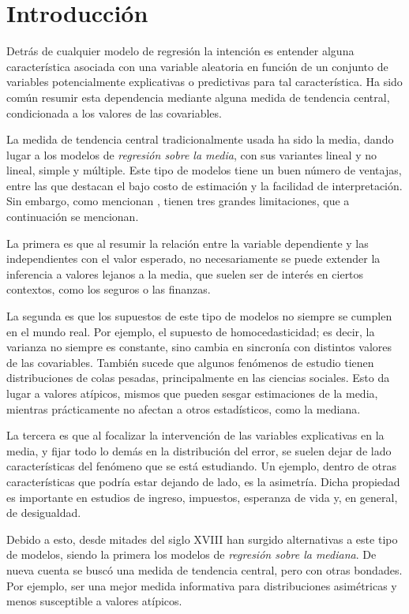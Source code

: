 \chapter{Introducci\'on}

Detr\'as de cualquier modelo de regresi\'on la intenci\'on es entender alguna caracter\'istica asociada con una variable aleatoria en funci\'on de un conjunto de variables potencialmente explicativas o predictivas para tal caracter\'istica. Ha sido com\'un resumir esta dependencia mediante alguna medida de tendencia central, condicionada a los valores de las covariables.

La medida de tendencia central tradicionalmente usada ha sido la media, dando lugar a los modelos de \textit{regresi\'on sobre la media}, con sus variantes lineal y no lineal, simple y m\'ultiple. Este tipo de modelos tiene un buen n\'umero de ventajas, entre las que destacan el bajo costo de estimaci\'on y la facilidad de interpretaci\'on. Sin embargo, como mencionan \cite{Hao_FrecQuantReg}, tienen tres grandes limitaciones, que a continuaci\'on se mencionan.

La primera es que al resumir la relaci\'on entre la variable dependiente y las independientes con el valor esperado, no necesariamente se puede extender la inferencia a valores lejanos a la media, que suelen ser de inter\'es en ciertos contextos, como los seguros o las finanzas.

La segunda es que los supuestos de este tipo de modelos no siempre se cumplen en el mundo real. Por ejemplo, el supuesto de homocedasticidad; es decir, la varianza no siempre es constante, sino cambia en sincron\'ia con distintos valores de las covariables. Tambi\'en sucede que algunos fen\'omenos de estudio tienen distribuciones de colas pesadas, principalmente en las ciencias sociales. Esto da lugar a valores at\'ipicos, mismos que pueden sesgar estimaciones de la media, mientras prácticamente no afectan a otros estadísticos, como la mediana.

La tercera es que al focalizar la intervenci\'on de las variables explicativas en la media, y fijar todo lo demás en la distribución del error, se suelen dejar de lado caracter\'isticas del fen\'omeno que se est\'a estudiando. Un ejemplo, dentro de otras caracter\'isticas que podr\'ia estar dejando de lado, es la asimetr\'ia. Dicha propiedad es importante en estudios de ingreso, impuestos, esperanza de vida y, en general, de desigualdad.

Debido a esto, desde mitades del siglo XVIII han surgido alternativas a este tipo de modelos, siendo la primera los modelos de \textit{regresi\'on sobre la mediana}. De nueva cuenta se busc\'o una medida de tendencia central, pero con otras bondades. Por ejemplo, ser una mejor medida informativa para distribuciones asim\'etricas y menos susceptible a valores at\'ipicos. 


